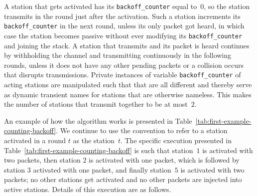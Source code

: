 \documentclass[11pt]{article}
\begin{document}
A station that gets activated has its \texttt{backoff\_counter} equal to~$0$, so the station transmits in the round just after the activation.
Such a station increments its  \texttt{backoff\_counter} in the next round, unless its only packet got heard, in which case the station becomes passive without ever modifying its \texttt{backoff\_counter} and joining the stack.
A station that transmits and its packet is heard continues by withholding the channel and transmitting continuously in the following rounds, unless it does not have any other pending packets or a collision occurs that disrupts transmissions.
Private instances of variable \texttt{backoff\_counter} of acting stations are manipulated such that that are all different and thereby serve as dynamic transient names for stations that are otherwise  nameless.
This makes the number of stations that transmit together to be at most~$2$.


An example of how the algorithm works is presented in Table~\ref{tab:first-example-counting-backoff}.
We continue to use the convention to refer to a station activated in a round $t$ as the station~$t$.
The specific execution presented in Table~\ref{tab:first-example-counting-backoff} is such that station~$1$ is activated with two packets, then station $2$ is activated with one packet, which is followed by station $3$ activated with one packet, and finally station~$5$ is activated with two packets; no other stations get activated and no other packets are injected into active stations.
Details of this execution are as follows.
\end{document}
